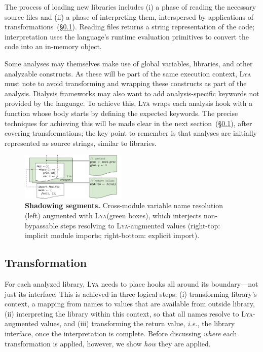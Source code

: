 \documentclass[letterpaper,twocolumn,10pt]{article}
\def\ie{{\em i.e.}, }
\newcommand{\sx}[1]{(\S\ref{#1})}
\newcommand{\sys}{{\scshape Lya}\xspace}
\newcommand{\pc}{PIC\xspace}
\begin{document}
The process of loading new libraries includes (i) a phase of reading the necessary source files and (ii) a phase of interpreting them, interspersed by applications of transformations~\sx{two}.
Reading files returns a string representation of the code; interpretation uses the language's runtime evaluation primitives to convert the code into an in-memory object.

Some analyses may themselves make use of global variables, libraries, and other analyzable constructs.
As these will be part of the same execution context, \sys must note to avoid transforming and wrapping these constructs as part of the analysis.
Dialysis frameworks may also want to add analysis-specific keywords not provided by the language.
To achieve this, \sys wraps each analysis hook with a function whose body starts by defining the expected keywords.
The precise techniques for achieving this will be made clear in the next section~\sx{two}, after covering transformations;
  the key point to remember is that analyses are initially represented as source strings, similar to libraries.

\begin{figure}[t]
\centering 
\includegraphics[width=0.45\textwidth]{./figs/lya_shadowing.pdf}
\caption{
  \textbf{Shadowing segments.}
  \textmd{
  Cross-module variable name resolution (left) augmented with \sys (green boxes), which interjects non-bypassable steps resolving to \sys-augmented values (right-top: implicit module imports; right-bottom: explicit import).
  }
  \vspace{-4mm}
}
\label{fig:shadowing}
\end{figure}


\subsection{Transformation}
\label{two}

For each analyzed library, \sys needs to place hooks all around its boundary---not just its interface.
This is achieved in three logical steps:
(i) transforming library's context, a mapping from names to values that are available from outside library,
(ii) interpreting the library within this context, so that all names resolve to \sys-augmented values, and
(iii) transforming the return value, \ie the library interface, once the interpretation is complete.
Before discussing \emph{where} each transformation is applied, however, we show \emph{how} they are applied.
\end{document}
